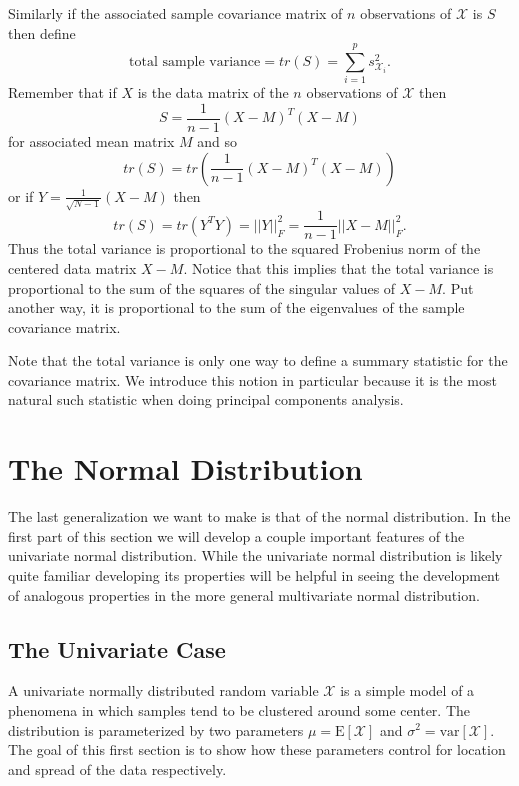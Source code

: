 \documentclass{book}
\newcommand{\bs}[1]{\boldsymbol{#1}}
\newcommand{\rv}[1]{\bs{\mathscr{#1}}}
\newcommand{\e}[1]{\text{E}\left[#1\right]}
\begin{document}
Similarly if the associated sample covariance matrix of $n$ observations of $\rv{X}$ is $S$ then define
$$
\text{total sample variance}=tr(S)=\sum_{i=1}^{p}s_{\mathscr{X}_i}^2.
$$
Remember that if $X$ is the data matrix of the $n$ observations of $\rv{X}$ then
$$
S=\frac{1}{n-1}(X-M)^T(X-M)
$$ 
for associated mean matrix $M$ and so
$$
tr(S)=tr\left(\frac{1}{n-1}(X-M)^T(X-M)\right)
$$ 
or if $Y=\frac{1}{\sqrt{N-1}}(X-M)$ then
$$
tr(S)=tr\left(Y^TY\right)=||Y||^2_F=\frac{1}{n-1}||X-M||^2_F.
$$
Thus the total variance is proportional to the squared Frobenius norm of the centered data matrix $X-M$. Notice that this implies that the total variance is proportional to the sum of the squares of the singular values of $X-M$. Put another way, it is proportional to the sum of the eigenvalues of the sample covariance matrix.



Note that the total variance is only one way to define a summary statistic for the covariance matrix. We introduce this notion in particular because it is the most natural such statistic when doing principal components analysis.


\section{The Normal Distribution}

The last generalization we want to make is that of the normal distribution. In the first part of this section we will develop a couple important features of the univariate normal distribution. While the univariate normal distribution is likely quite familiar developing its properties will be helpful in seeing the development of analogous properties in the more general  multivariate normal distribution. 

\subsection{The Univariate Case}

A univariate normally distributed random variable $\mathscr{X}$ is a simple model of a phenomena in which samples tend to be clustered around some center. The distribution is parameterized by two parameters $\mu=\e{\mathscr{X}}$ and $\sigma^2=\text{var}\left[\mathscr{X}\right]$. The goal of this first section is to show how these parameters control for location and spread of the data respectively. 
\end{document}
